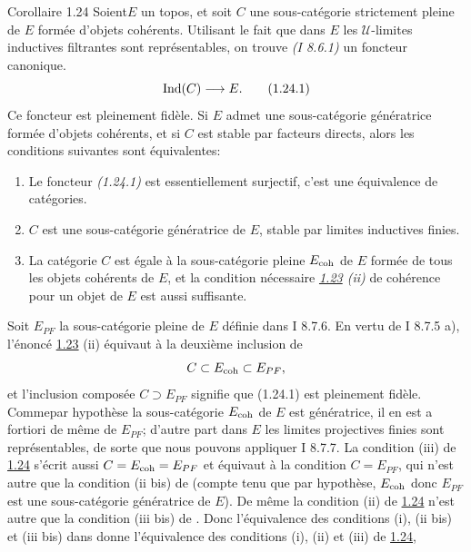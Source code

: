 \documentclass[10pt]{../fichiers-configuration-latex/smfart}
\begin{document}
\begin{enonce*}{Corollaire 1.24}
Soient\pageoriginale $E$ un topos, et soit $C$ une sous-catégorie
strictement pleine
de $E$ formée d'objets cohérents. Utilisant le fait que dans $E$ les
$𝒰$-limites inductives filtrantes sont représentables, on trouve \emph{(I
  8.6.1)} un foncteur canonique.
\begin{equation*}
\Ind (C) \to E{\quoi}.\tag{1.24.1}
\end{equation*}
Ce foncteur est pleinement fidèle. Si $E$ admet une sous-catégorie
génératrice formée d'objets cohérents, et si $C$ est stable par
facteurs directs, alors les conditions suivantes sont équivalentes:
\begin{enumerate}
\renewcommand{\theenumi}{\roman{enumi}}
\renewcommand{\labelenumi}{(\theenumi)}
\item Le foncteur \emph{(1.24.1)} est essentiellement surjectif, \ie c'est
  une équivalence de catégories.

\item $C$ est une sous-catégorie génératrice de $E$, stable par
  limites inductives finies.

\item La catégorie $C$ est égale à la sous-catégorie pleine $E_{\mathrm{coh}}$
  de $E$ formée de tous les objets cohérents de $E$, et la condition
  nécessaire \emph{\hyperref[VI.thm1.23]{1.23} (ii)} de cohérence pour un objet de $E$ est
  aussi suffisante.
\end{enumerate}
\end{enonce*}

Soit $E_{PF}$ la sous-catégorie pleine de $E$ définie dans I 8.7.6. En
vertu de I 8.7.5 a), l'énoncé \hyperref[VI.thm1.23]{1.23} (ii) équivaut à la deuxième
inclusion de
$$
C \subset E_{\mathrm{coh}} \subset E_{PF}{},
$$
et l'inclusion composée $C \supset E_{PF}$ signifie que (1.24.1) est
pleinement fidèle. Comme\pageoriginale par hypothèse la sous-catégorie
$E_{\mathrm{coh}}$ de
$E$ est génératrice, il en est a fortiori de même de $E_{PF}$; d'autre
part dans $E$ les limites projectives finies sont représentables, de
sorte que nous pouvons appliquer I 8.7.7. La condition (iii) de \hyperref[VI.cor1.24]{1.24}
s'écrit aussi $C = E_{\mathrm{coh}} = E_{PF}$ et équivaut à la condition $C =
E_{PF}$, qui n'est autre que la condition (ii bis) de \loccit (compte
tenu que par hypothèse,  $E_{\mathrm{coh}}$ donc $E_{PF}$ est une
sous-catégorie génératrice de $E$). De même la condition (ii) de \hyperref[VI.cor1.24]{1.24}
n'est autre que la condition (iii bis) de \loccit. Donc l'équivalence
des conditions (i), (ii bis) et (iii bis) dans \loccit donne
l'équivalence des conditions (i), (ii) et (iii) de \hyperref[VI.cor1.24]{1.24}, \cqfd
\end{document}
